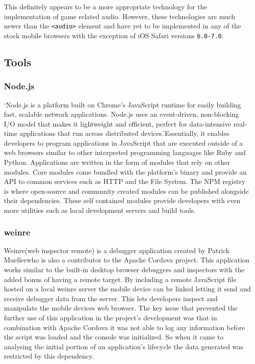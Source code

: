 \documentclass[final]{cmpreport}
\begin{document}

This definitely appears to be a more appropriate technology for the implementation of game related audio. However, these technologies are much newer than the \texttt{<audio>} element and have yet to be implemented in any of the stock mobile browsers with the exception of iOS Safari versions \texttt{6.0-7.0\footnotemark}.


\subsection{Tools}

\subsubsection{Node.js}
`Node.js is a platform built on Chrome's JavaScript runtime for easily building fast, scalable network applications. Node.js uses an event-driven, non-blocking I/O model that makes it lightweight and efficient, perfect for data-intensive real-time applications that run across distributed devices.'\footnotemark Essentially, it enables developers to program applications in JavaScript that are executed outside of a web browsers similar to other interpreted programming languages like Ruby and Python. Applications are written in the form of modules that rely on other modules. Core modules come bundled with the platform's binary and provide an API to common services such as HTTP and the File System. The NPM registry is where open-source and community created modules can be published alongside their dependencies. These self contained modules provide developers with even more utilities such as local development servers and build tools.


\subsubsection{weinre}
\label{sec:weinre}
Weinre\footnotemark (web inspector remote) is a debugger application created by Patrick Mueller\footnotemark who is also a contributor to the Apache Cordova project. This application works similar to the built-in desktop browser debuggers and inspectors with the added bonus of having a remote target. By including a remote JavaScript file hosted on a local weinre server the mobile device can be linked letting it send and receive debugger data from the server. This lets developers inspect and manipulate the mobile devices web browser. The key issue that prevented the further use of this application in the project's development was that in combination with Apache Cordova it was not able to log any information before the script was loaded and the console was initialized. So when it came to analysing the initial portion of an application's lifecycle the data generated was restricted by this dependency.
\end{document}
